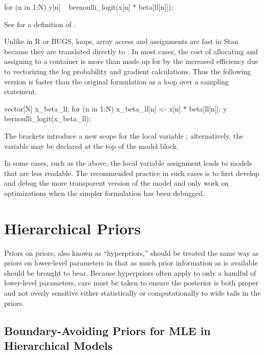 \begin{stancode}
  for (n in 1:N)
    y[n] ~ bernoulli_logit(x[n] * beta[ll[n]]);    
\end{stancode}
%
See  for a definition of
.

Unlike in R or BUGS, loops, array access and assignments are fast in
Stan because they are translated directly to \Cpp.  In most cases, the
cost of allocating and assigning to a container is more than made up
for by the increased efficiency due to vectorizing the log probability
and gradient calculations.  Thus the following version is faster than
the original formulation as a loop over a sampling statement.
%

\begin{stancode}
  {
    vector[N] x_beta_ll;
    for (n in 1:N)
      x_beta_ll[n] <- x[n] * beta[ll[n]];
    y ~ bernoulli_logit(x_beta_ll);
  }
\end{stancode}
%
The brackets introduce a new scope for the local variable
; alternatively, the variable may be declared at the
top of the model block.  

In some cases, such as the above, the local variable assignment leads
to models that are less readable.  The recommended practice in such
cases is to first develop and debug the more transparent version of
the model and only work on optimizations when the simpler formulation
has been debugged.


\section{Hierarchical Priors}\label{hierarchical-priors.section}

Priors on priors, also known as ``hyperpriors,'' should be treated the
same way as priors on lower-level parameters in that as much prior
information as is available should be brought to bear.  Because
hyperpriors often apply to only a handful of lower-level parameters,
care must be taken to ensure the posterior is both proper and not
overly sensitive either statistically or computationally to wide tails
in the priors.

\subsection{Boundary-Avoiding Priors for MLE in Hierarchical Models}

